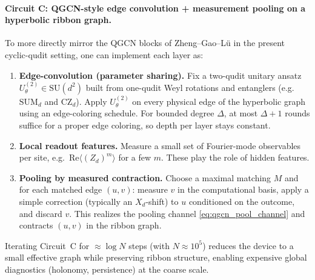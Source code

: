 \documentclass[11pt,oneside]{amsbook}
\numberwithin{equation}{section}
\theoremstyle{plain}
\theoremstyle{definition}
\theoremstyle{remark}
\begin{document}
\paragraph{Circuit C: QGCN-style edge convolution + measurement pooling on a hyperbolic ribbon graph.}
To more directly mirror the QGCN blocks of Zheng--Gao--L\"u \cite{Zheng2021QGCN} in the present cyclic-qudit setting,
one can implement each layer as:
\begin{enumerate}
\item \textbf{Edge-convolution (parameter sharing).} Fix a two-qudit unitary ansatz $U^{(2)}_\theta\in \mathrm{SU}(d^2)$ built
from one-qudit Weyl rotations and entanglers (e.g.\ $\mathrm{SUM}_d$ and $\mathrm{CZ}_d$).
Apply $U^{(2)}_\theta$ on every physical edge of the hyperbolic graph using an edge-coloring schedule.
For bounded degree $\Delta$, at most $\Delta+1$ rounds suffice for a proper edge coloring, so depth per layer stays constant.
\item \textbf{Local readout features.} Measure a small set of Fourier-mode observables per site, e.g.\ $\mathrm{Re}\langle (Z_d)^m\rangle$
for a few $m$.  These play the role of hidden features.
\item \textbf{Pooling by measured contraction.} Choose a maximal matching $M$ and for each matched edge $(u,v)$:
measure $v$ in the computational basis, apply a simple correction (typically an $X_d$-shift) to $u$ conditioned on the outcome,
and discard $v$.
This realizes the pooling channel \eqref{eq:qgcn_pool_channel} and contracts $(u,v)$ in the ribbon graph.
\end{enumerate}
Iterating Circuit~C for $\approx \log N$ steps (with $N\approx 10^5$) reduces the device to a small effective graph while preserving
ribbon structure, enabling expensive global diagnostics (holonomy, persistence) at the coarse scale.
\end{document}
